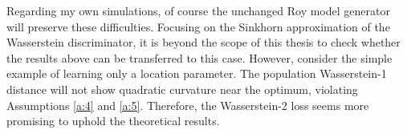 Regarding my own simulations, of course the unchanged Roy model generator will preserve these difficulties.
Focusing on the Sinkhorn approximation of the Wasserstein discriminator, it is beyond the scope of this thesis to check whether the results above can be transferred to this case.
However, consider the simple example of learning only a location parameter.
The population Wasserstein-1 distance will not show quadratic curvature near the optimum, violating Assumptions \ref{a:4} and \ref{a:5}. %
Therefore, the Wasserstein-2 loss seems more promising to uphold the theoretical results.